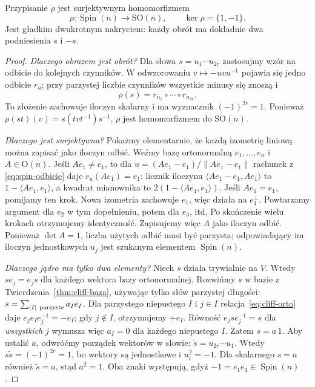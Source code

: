 \begin{twierdzenie}
\label{thm:spin-nakrycie}
Przypisanie $\rho$ jest surjektywnym homomorfizmem
\[
 \rho:\operatorname{Spin}(n)\longrightarrow\mathrm{SO}(n),
 \qquad\ker\rho=\{1,-1\}.
\]
Jest gładkim dwukrotnym nakryciem: każdy obrót
ma dokładnie dwa podniesienia $s$ i $-s$.
\end{twierdzenie}
\begin{proof}
\emph{Dlaczego obrazem jest obrót?}
Dla słowa $s=u_1\cdots u_{2r}$ zastosujmy
wzór na odbicie do kolejnych czynników.
W odwzorowaniu $v\mapsto-u v u^{-1}$ pojawia się
jedno odbicie $r_u$; przy parzystej liczbie
czynników wszystkie minusy się znoszą i
\[
 \rho(s)=r_{u_1}\circ\cdots\circ r_{u_{2r}}.
\]
To złożenie zachowuje iloczyn skalarny i ma
wyznacznik $(-1)^{2r}=1$. Ponieważ
$\rho(st)(v)=s(tvt^{-1})s^{-1}$,
$\rho$ jest homomorfizmem do $\mathrm{SO}(n)$.

\emph{Dlaczego jest surjektywna?}
Pokażmy elementarnie, że każdą izometrię liniową
można zapisać jako iloczyn odbić. Weźmy bazę
ortonormalną $e_1,\ldots,e_n$ i $A\in\mathrm O(n)$.
Jeśli $Ae_1\ne e_1$, to dla
$u=(Ae_1-e_1)/\|Ae_1-e_1\|$ rachunek z
\eqref{eq:spin-odbicie} daje $r_u(Ae_1)=e_1$:
licznik iloczynu
$\langle Ae_1-e_1,Ae_1\rangle$ to
$1-\langle Ae_1,e_1\rangle$, a kwadrat
mianownika to $2(1-\langle Ae_1,e_1\rangle)$.
Jeśli $Ae_1=e_1$, pomijamy ten krok.
Nowa izometria zachowuje $e_1$, więc działa
na $e_1^\perp$. Powtarzamy argument dla $e_2$
w tym dopełnieniu, potem dla $e_3$, itd.
Po skończenie wielu krokach otrzymujemy
identyczność. Zapisujemy więc $A$ jako
iloczyn odbić. Ponieważ $\det A=1$, liczba
użytych odbić musi być parzysta; odpowiadający
im iloczyn jednostkowych $u_j$ jest szukanym
elementem $\operatorname{Spin}(n)$.

\emph{Dlaczego jądro ma tylko dwa elementy?}
Niech $s$ działa trywialnie na $V$. Wtedy
$se_j=e_js$ dla każdego wektora bazy ortonormalnej.
Rozwińmy $s$ w bazie z
Twierdzenia~\ref{thm:cliff-baza}, używając tylko
słów parzystej długości:
$s=\sum_{|I|\ {\rm parzyste}}a_I e_I$.
Dla parzystego niepustego $I$ i $j\in I$
relacja~\eqref{eq:cliff-orto} daje
$e_je_Ie_j^{-1}=-e_I$; gdy $j\notin I$,
otrzymujemy $+e_I$. Równość
$e_jse_j^{-1}=s$ dla \emph{wszystkich} $j$
wymusza więc $a_I=0$ dla każdego niepustego $I$.
Zatem $s=a\,1$. Aby ustalić $a$, odwróćmy
porządek wektorów w słowie:
$\widetilde s=u_{2r}\cdots u_1$.
Wtedy $s\widetilde s=(-1)^{2r}=1$,
bo wektory są jednostkowe i $u_i^2=-1$.
Dla skalarnego $s=a$ również $\widetilde s=a$,
stąd $a^2=1$. Oba znaki występują,
gdyż $-1=e_1e_1\in\operatorname{Spin}(n)$.


\end{proof}

